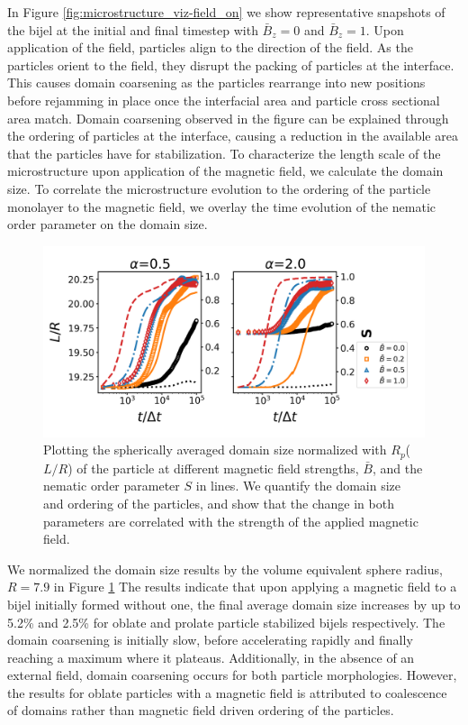 In Figure \ref{fig:microstructure_viz-field_on} we show representative snapshots of the bijel at the initial and final timestep with $\bar{B}_z = 0$ and $\bar{B}_z = 1$. 
Upon application of the field, particles align to the direction of the field. As the particles orient to the field, they disrupt the packing of particles at
the interface. This causes domain coarsening as the particles rearrange into new positions before rejamming in place once the interfacial
area and particle cross sectional area match. Domain coarsening observed in the figure can be explained through the ordering of particles at the interface, causing a 
reduction in the available area that the particles have for stabilization. To characterize the length scale of the microstructure upon application of the magnetic field,
we calculate the domain size. To correlate the microstructure evolution to the ordering of the particle monolayer to the magnetic field, we overlay the time evolution of the
nematic order parameter on the domain size. \cite{veerman_phase_1992} 

\begin{figure} 
\centering 
\includegraphics[scale=0.5]{../figures/results/paper2/domain_size-field_on.png} 
\caption{Plotting the spherically averaged domain size normalized with $R_p$($L/R$) of the particle at different magnetic field strengths, $\bar{B}$, and the nematic order 
         parameter $S$ in lines. We quantify the domain size and ordering of the particles, and show that the change in both parameters are correlated with the strength of 
         the applied magnetic field.} 
\label{fig:domain_size-field_on} 
\end{figure}

We normalized the domain size results by the volume equivalent sphere radius, $R = 7.9$ in Figure \ref{fig:domain_size-field_on} The results indicate that upon 
applying a magnetic field to a bijel initially formed without one, the final average domain size increases by up to 5.2\% and 2.5\% for oblate and 
prolate particle stabilized bijels respectively. The domain coarsening is initially slow, before accelerating rapidly and finally reaching a maximum where it plateaus. 
Additionally, in the absence of an external field, domain coarsening occurs for both particle morphologies. However, the results
for oblate particles with a magnetic field is attributed to coalescence of domains rather than magnetic field driven ordering of the particles.

